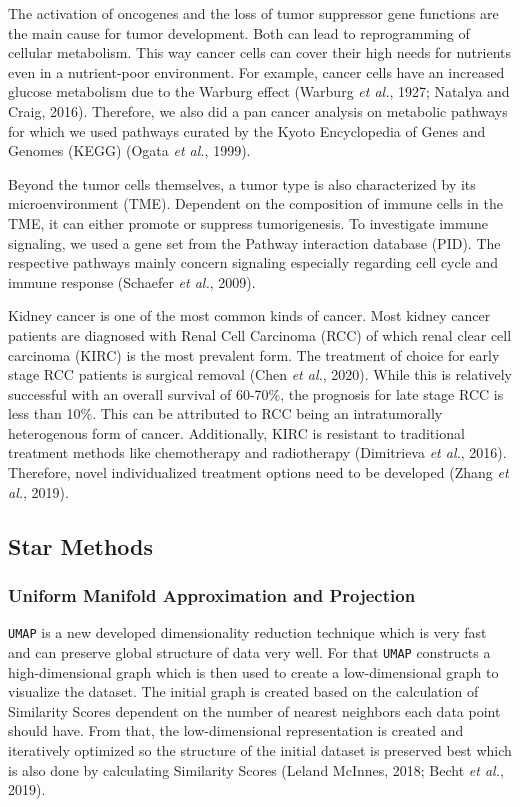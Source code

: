 \documentclass[
  parskip,
  oneside]{\documentclass[oneside]{book}}
\begin{document}
The activation of oncogenes and the loss of tumor suppressor gene
functions are the main cause for tumor development. Both can lead to
reprogramming of cellular metabolism. This way cancer cells can cover
their high needs for nutrients even in a nutrient-poor environment. For
example, cancer cells have an increased glucose metabolism due to the
Warburg effect (Warburg \emph{et al.}, 1927; Natalya and Craig, 2016).
Therefore, we also did a pan cancer analysis on metabolic pathways for
which we used pathways curated by the Kyoto Encyclopedia of Genes and
Genomes (KEGG) (Ogata \emph{et al.}, 1999).

Beyond the tumor cells themselves, a tumor type is also characterized by
its microenvironment (TME). Dependent on the composition of immune cells
in the TME, it can either promote or suppress tumorigenesis. To
investigate immune signaling, we used a gene set from the Pathway
interaction database (PID). The respective pathways mainly concern
signaling especially regarding cell cycle and immune response (Schaefer
\emph{et al.}, 2009).

Kidney cancer is one of the most common kinds of cancer. Most kidney
cancer patients are diagnosed with Renal Cell Carcinoma (RCC) of which
renal clear cell carcinoma (KIRC) is the most prevalent form. The
treatment of choice for early stage RCC patients is surgical removal
(Chen \emph{et al.}, 2020). While this is relatively successful with an
overall survival of 60-70\%, the prognosis for late stage RCC is less
than 10\%. This can be attributed to RCC being an intratumorally
heterogenous form of cancer. Additionally, KIRC is resistant to
traditional treatment methods like chemotherapy and radiotherapy
(Dimitrieva \emph{et al.}, 2016). Therefore, novel individualized
treatment options need to be developed (Zhang \emph{et al.}, 2019).

\hypertarget{star-methods}{%
\subsection{Star Methods}\label{star-methods}}

\hypertarget{uniform-manifold-approximation-and-projection}{%
\subsubsection{Uniform Manifold Approximation and
Projection}\label{uniform-manifold-approximation-and-projection}}

\texttt{UMAP} is a new developed dimensionality reduction technique
which is very fast and can preserve global structure of data very well.
For that \texttt{UMAP} constructs a high-dimensional graph which is then
used to create a low-dimensional graph to visualize the dataset. The
initial graph is created based on the calculation of Similarity Scores
dependent on the number of nearest neighbors each data point should
have. From that, the low-dimensional representation is created and
iteratively optimized so the structure of the initial dataset is
preserved best which is also done by calculating Similarity Scores
(Leland McInnes, 2018; Becht \emph{et al.}, 2019).
\end{document}

